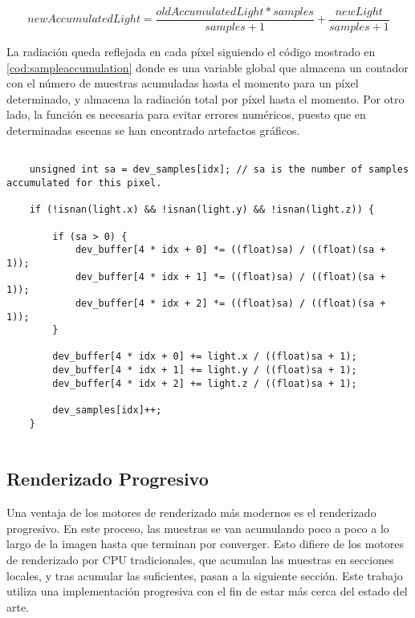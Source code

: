 \[{newAccumulatedLight = \frac{oldAccumulatedLight * samples}{samples + 1} + \frac{newLight}{samples + 1}}\]
	
La radiación queda reflejada en cada píxel siguiendo el código mostrado en \autoref{cod:sampleaccumulation} donde  es una variable global que almacena un contador con el número de muestras acumuladas hasta el momento para un píxel determinado, y  almacena la radiación total por píxel hasta el momento. Por otro lado, la función  es necesaria para evitar errores numéricos, puesto que en determinadas escenas se han encontrado artefactos gráficos.

\begin{minipage}[c]{0.95\textwidth}
\begin{lstlisting}[label={cod:sampleaccumulation}, caption={Código para la acumulación de luz por cada píxel}]
	
	unsigned int sa = dev_samples[idx]; // sa is the number of samples accumulated for this pixel.
	
	if (!isnan(light.x) && !isnan(light.y) && !isnan(light.z)) {

        if (sa > 0) {
            dev_buffer[4 * idx + 0] *= ((float)sa) / ((float)(sa + 1));
            dev_buffer[4 * idx + 1] *= ((float)sa) / ((float)(sa + 1));
            dev_buffer[4 * idx + 2] *= ((float)sa) / ((float)(sa + 1));
        }

        dev_buffer[4 * idx + 0] += light.x / ((float)sa + 1);
        dev_buffer[4 * idx + 1] += light.y / ((float)sa + 1);
        dev_buffer[4 * idx + 2] += light.z / ((float)sa + 1);

        dev_samples[idx]++;
    }
	
\end{lstlisting}
\end{minipage}
	
\subsection{Renderizado Progresivo}
\label{progressiverender}
		
Una ventaja de los motores de renderizado más modernos es el renderizado progresivo. En este proceso, las muestras se van acumulando poco a poco a lo largo de la imagen hasta que terminan por converger. Esto difiere de los motores de renderizado por CPU tradicionales, que acumulan las muestras en secciones locales, y tras acumular las suficientes, pasan a la siguiente sección. Este trabajo utiliza una implementación progresiva con el fin de estar más cerca del estado del arte.

